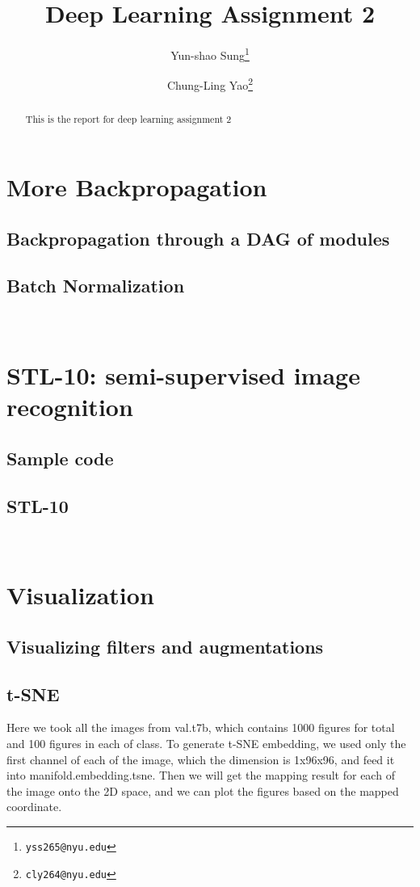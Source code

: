 \documentclass[final]{siamltexmm}
\title{Deep Learning Assignment 2}
\author{Yun-shao Sung\thanks{\tt yss265@nyu.edu}
        \and Chung-Ling Yao\thanks{\tt cly264@nyu.edu}}
\begin{document}
\maketitle

\begin{abstract}
This is the report for deep learning assignment 2
\end{abstract}

\pagestyle{myheadings}
\thispagestyle{plain}

\section{More Backpropagation}
\subsection{Backpropagation through a DAG of modules}
\subsection{Batch Normalization}

\\
\section{STL-10: semi-supervised image recognition}
\subsection{Sample code}
\subsection{STL-10}


\\
\section{Visualization}
\subsection{Visualizing filters and augmentations}
\subsection{t-SNE}
Here we took all the images from val.t7b, which contains 1000 figures for total and 100 figures in each of class. To generate t-SNE embedding, we used only the first channel of each of the image, which the dimension is 1x96x96, and feed it into manifold.embedding.tsne. Then we will get the mapping result for each of the image onto the 2D space, and we can plot the figures based on the mapped coordinate.
\end{document}
